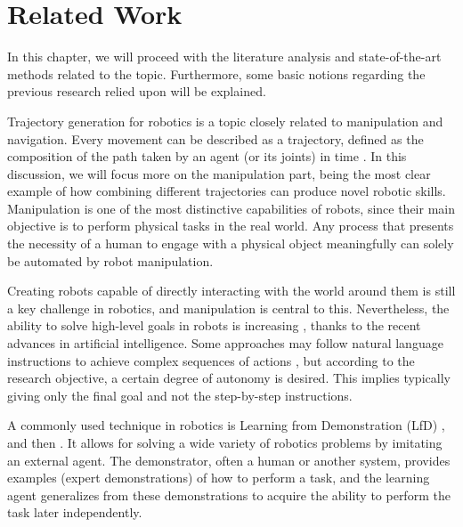 \chapter{Related Work} %
\label{chap:background}

In this chapter, we will proceed with the literature analysis and state-of-the-art methods related to the topic. Furthermore, some basic notions regarding the previous research relied upon will be explained.

Trajectory generation for robotics is a topic closely related to manipulation and navigation. Every movement can be described as a trajectory, defined as the composition of the path taken by an agent (or its joints) in time \cite{biagiotti2008trajectory}. 
In this discussion, we will focus more on the manipulation part, being the most clear example of how combining different trajectories can produce novel robotic skills. Manipulation is one of the most distinctive capabilities of robots, since their main objective is to perform physical tasks in the real world. Any process that presents the necessity of a human to engage with a physical object meaningfully can solely be automated by robot manipulation. \cite{rosen2022role}

Creating robots capable of directly interacting with the world around them is still a key challenge in robotics, and manipulation is central to this. \cite{kroemer2021review} 
Nevertheless, the ability to solve high-level goals in robots is increasing \cite{gupta2019relay}, \cite{simeonov2021long} thanks to the recent advances in artificial intelligence.  
Some approaches may follow natural language instructions to achieve complex sequences of actions \cite{hu2019hierarchical}, but according to the research objective, a certain degree of autonomy is desired. This implies typically giving only the final goal and not the step-by-step instructions. 



A commonly used technique in robotics is Learning from Demonstration (LfD) \cite{ARGALL2009469}, and then \cite{ravichandar2020recent}. It allows for solving a wide variety of robotics problems by imitating an external agent. The demonstrator, often a human or another system, provides examples (expert demonstrations) of how to perform a task, and the learning agent generalizes from these demonstrations to acquire the ability to perform the task later independently.

